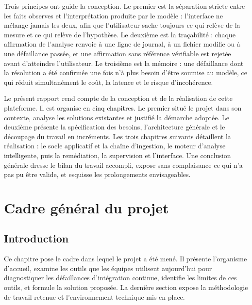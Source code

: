 \documentclass[12pt,a4paper,oneside]{report}
\begin{document}
Trois principes ont guide la conception. Le premier est la séparation stricte
entre les faits observes et l'interprétation produite par le modèle : l'interface
ne mélange jamais les deux, afin que l'utilisateur sache toujours ce qui relève
de la mesure et ce qui relève de l'hypothèse. Le deuxième est la traçabilité :
chaque affirmation de l'analyse renvoie à une ligne de journal, à un fichier
modifie ou à une défaillance passée, et une affirmation sans référence vérifiable
est rejetée avant d'atteindre l'utilisateur. Le troisième est la mémoire : une
défaillance dont la résolution a été confirmée une fois n'à plus besoin d'être
soumise au modèle, ce qui réduit simultanément le coût, la latence et le risque
d'incohérence.

Le présent rapport rend compte de la conception et de la réalisation de cette
plateforme. Il est organise en cinq chapitres. Le premier situé le projet dans
son contexte, analyse les solutions existantes et justifié la démarche adoptée.
Le deuxième présente la spécification des besoins, l'architecture générale et le
découpage du travail en incréments. Les trois chapitres suivants détaillent la
réalisation : le socle applicatif et la chaîne d'ingestion, le moteur d'analyse
intelligente, puis la remédiation, la supervision et l'interface. Une conclusion
générale dresse le bilan du travail accompli, expose sans complaisance ce qui n'a
pas pu être valide, et esquisse les prolongements envisageables.

\clearpage

\chapter{Cadre général du projet}

\section*{Introduction}

Ce chapitre pose le cadre dans lequel le projet a été mené. Il présente
l'organisme d'accueil, examine les outils que les équipes utilisent aujourd'hui
pour diagnostiquer les défaillances d'intégration continue, identifie les limites
de ces outils, et formule la solution proposée. La dernière section expose la
méthodologie de travail retenue et l'environnement technique mis en place.
\end{document}
